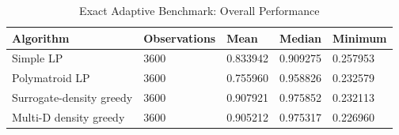 \begin{table}[t]
\centering
\small
\caption{Exact Adaptive Benchmark: Overall Performance}
\begin{tabular}{lllll}
\toprule
Algorithm & Observations & Mean & Median & Minimum \\
\midrule
Simple LP & 3600 & 0.833942 & 0.909275 & 0.257953 \\
Polymatroid LP & 3600 & 0.755960 & 0.958826 & 0.232579 \\
Surrogate-density greedy & 3600 & 0.907921 & 0.975852 & 0.232113 \\
Multi-D density greedy & 3600 & 0.905212 & 0.975317 & 0.226960 \\
\bottomrule
\end{tabular}
\end{table}
